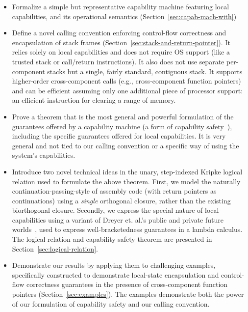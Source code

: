 \documentclass[compsoc,conference,letterpaper,fleqn]{IEEEtran}
\newcommand\lau[1]{{\color{purple} \sf \footnotesize {LS: #1}}\\}
\renewcommand\lau[1]{}
\begin{document}
\begin{itemize}
\item Formalize a simple but representative capability machine featuring local
  capabilities, and its operational semantics
  (Section~\ref{sec:capab-mach-with})
\item Define a novel calling convention enforcing control-flow correctness and
  encapsulation of stack frames (Section~\ref{sec:stack-and-return-pointer}). It
  relies solely on local capabilities and does not require OS support (like a
  trusted stack or call/return instructions). It also does not use separate
  per-component stacks but a single, fairly standard, contiguous stack. It
  supports higher-order cross-component calls (e.g., cross-component function
  pointers) and can be efficient assuming only one additional piece of processor
  support: an efficient instruction for clearing a range of memory.
\item Prove a theorem that is the most general and powerful formulation of the
  guarantees offered by a capability machine (a form of capability
  safety~\citet{Devriese:2016ObjCap,Maffeis2010OC}), including the specific
  guarantees offered for local capabilities. It is very general and not tied to
  our calling convention or a specific way of using the system's capabilities.
\item Introduce two novel technical ideas in the unary, step-indexed Kripke
  logical relation used to formulate the above theorem. First, we model the
  naturally continuation-passing-style of assembly code (with return pointers as
  continuations) using a \emph{single} orthogonal closure, rather than the
  existing biorthogonal closure. Secondly, we express the special nature of
  local capabilities using a variant of Dreyer et. al.'s public and private
  future worlds~\citep{Dreyer:jfp12}, used to express well-bracketedness
  guarantees in a lambda calculus. The logical relation and capability safety
  theorem are presented in Section~\ref{sec:logical-relation}.
\item Demonstrate our results by applying them to challenging examples,
  specifically constructed to demonstrate local-state encapsulation and
  control-flow correctness guarantees in the presence of cross-component
  function pointers (Section~\ref{sec:examples}). The examples demonstrate both
  the power of our formulation of capability safety and our calling convention.
\end{itemize}
\end{document}
